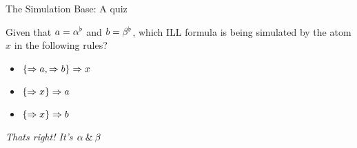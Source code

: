 \documentclass{beamer}
\begin{document}
\begin{frame}{The Simulation Base: A quiz}
	\begin{example}
		Given that $a={\alpha}^{\flat}$ and $b={\beta}^{\flat}$, which ILL formula is being simulated by the atom $x$ in the following rules?
		\begin{itemize}
			\item $\{\Rightarrow a,\Rightarrow b\} \Rightarrow x$
			\item $\{\Rightarrow x\} \Rightarrow a$
			\item $\{\Rightarrow x\} \Rightarrow b$
		\end{itemize}
	\end{example}
	\pause
	\begin{center}
		\emph{Thats right! It's $\alpha\mathbin{\&}\beta$}
	\end{center}
\end{frame}
\end{document}
